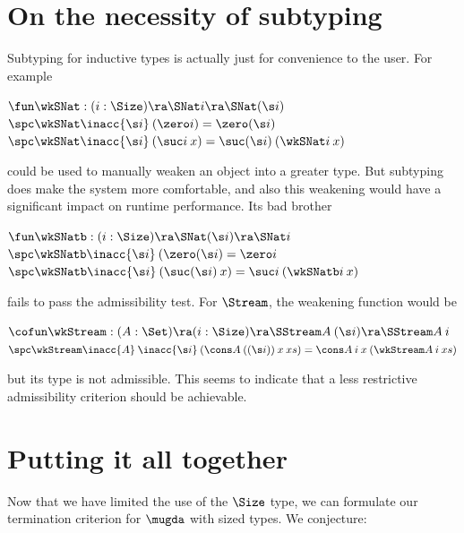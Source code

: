 \section{On the necessity of subtyping}
Subtyping for inductive types is actually just for convenience to the user. 
For example
\begin{bsp}
$\fun \wkSNat : (i : \Size ) \ra \SNat i \ra \SNat (\s i)$\\
$\spc \wkSNat \inacc{\s i} \: (\zero i) = \zero (\s i)$\\
$\spc \wkSNat \inacc{\s i} \: (\suc i \: x) = \suc (\s i) \: (\wkSNat i \: x) $
\end{bsp}
could be used to manually weaken an object into a greater type.
But subtyping does make the system more comfortable, and also this weakening would have
a significant impact on runtime performance.
Its bad brother 
\begin{bsp}
$\fun \wkSNatb : (i : \Size ) \ra \SNat (\s i) \ra \SNat i$\\
$\spc \wkSNatb \inacc{\s i} \: (\zero (\s i) = \zero i$\\
$\spc \wkSNatb \inacc{\s i} \: (\suc (\s i) \: x) = \suc i \: (\wkSNatb i \: x) $
\end{bsp}
fails to pass the admissibility test. 
For $\Stream$, the weakening function would be
\begin{bsp}
$\cofun \wkStream : ( A : \Set ) \ra (i : \Size ) \ra \SStream A \: (\s i) \ra \SStream A \: i$\\
$\spc \wkStream \inacc{A} \: \inacc{\s i} \: (\cons A \: ((\s i)) \: x \: xs) = \cons A \: i \: x \: (\wkStream A \: i \: xs) $
\end{bsp}
but its type is not admissible. This seems to indicate that a less restrictive admissibility criterion should be achievable.

\section{Putting it all together}
Now that we have limited the use of the $\Size$ type, we can formulate our termination criterion for 
$\mugda$ with sized types. We conjecture:
